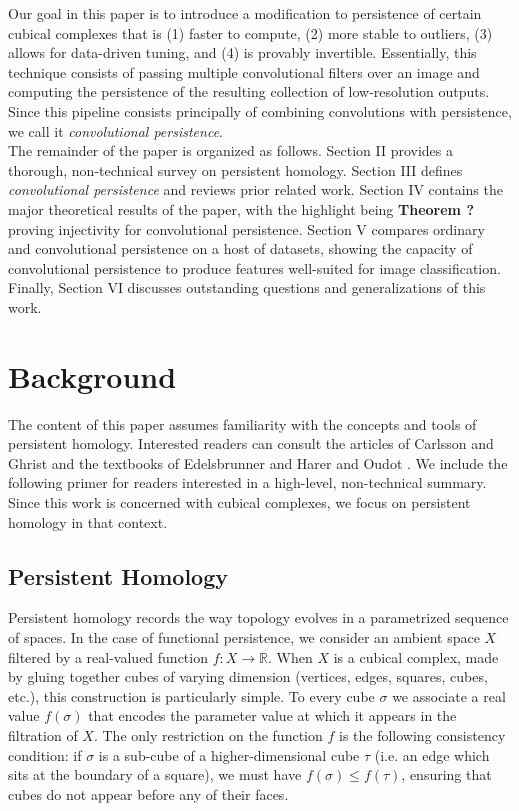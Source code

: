 \documentclass[conference]{IEEEtran}
\theoremstyle{definition}
\numberwithin{figure}{section}
\begin{document}
Our goal in this paper is to introduce a modification to persistence of certain cubical complexes that is (1) faster to compute, (2) more stable to outliers, (3) allows for data-driven tuning, and (4) is provably invertible. Essentially, this technique consists of passing multiple convolutional filters over an image and computing the persistence of the resulting collection of low-resolution outputs. Since this pipeline consists principally of combining convolutions with persistence, we call it \emph{convolutional persistence}.\\

The remainder of the paper is organized as follows. Section II provides a thorough, non-technical survey on persistent homology. Section III defines \emph{convolutional persistence} and reviews prior related work. Section IV contains the major theoretical results of the paper, with the highlight being {\bf Theorem ?} proving injectivity for convolutional persistence. Section V compares ordinary and convolutional persistence on a host of datasets, showing the capacity of convolutional persistence to produce features well-suited for image classification. Finally, Section VI discusses outstanding questions and generalizations of this work.

\section{Background}
\label{sec:background}
The content of this paper assumes familiarity with the concepts and tools of persistent homology. Interested readers can consult the articles of Carlsson \cite{carlsson2009topology} and Ghrist \cite{ghrist2008barcodes} and the textbooks of 
Edelsbrunner and Harer \cite{edelsbrunner2010computational} and Oudot \cite{oudot2015persistence}. We include the following primer for readers interested in a high-level, non-technical summary. Since this work is concerned with cubical complexes, we focus on persistent homology in that context. 

\subsection{Persistent Homology}

Persistent homology records the way topology evolves in a parametrized sequence of spaces. In the case of functional persistence, we consider an ambient space $X$ filtered by a real-valued function $f:X \to \mathbb{R}$. When $X$ is a cubical complex, made by gluing together cubes of varying dimension (vertices, edges, squares, cubes, etc.), this construction is particularly simple. To every cube $\sigma$ we associate a real value $f(\sigma)$ that encodes the parameter value at which it appears in the filtration of $X$. The only restriction on the function $f$ is the following consistency condition: if $\sigma$ is a sub-cube of a higher-dimensional cube $\tau$ (i.e. an edge which sits at the boundary of a square), we must have $f(\sigma) \leq f(\tau)$, ensuring that cubes do not appear before any of their faces.\\
\end{document}
